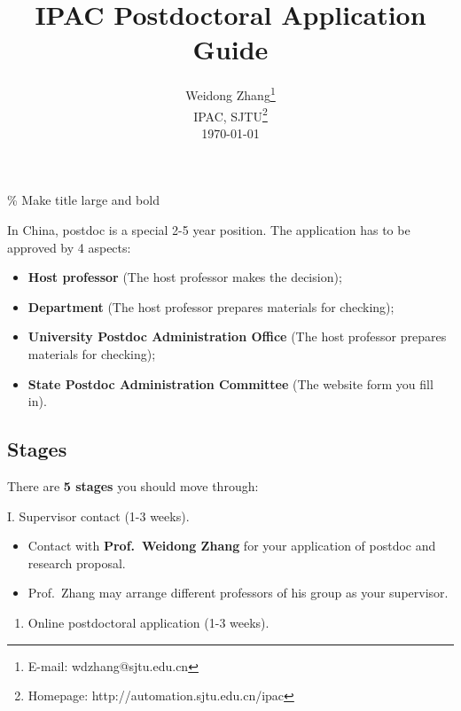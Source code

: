 \documentclass[]{article}
\date{}
\providecommand{\tightlist}{%
  \setlength{\itemsep}{0pt}\setlength{\parskip}{0pt}}
\begin{document}
\newcommand*{\affaddr}[1]{#1}

\% Make title large and bold

\title{\Large\bfseries IPAC Postdoctoral Application Guide}
\author{
    Weidong Zhang\thanks{E-mail: wdzhang@sjtu.edu.cn}\\
IPAC, SJTU\thanks{Homepage: http://automation.sjtu.edu.cn/ipac}\\
\today
}

\maketitle

In China, postdoc is a special 2-5 year position. The application has to
be approved by 4 aspects:

\begin{itemize}
\tightlist
\item
  \textbf{Host professor} (The host professor makes the decision);
\item
  \textbf{Department} (The host professor prepares materials for
  checking);
\item
  \textbf{University Postdoc Administration Office} (The host professor
  prepares materials for checking);
\item
  \textbf{State Postdoc Administration Committee} (The website form you
  fill in).
\end{itemize}

\hypertarget{stages}{%
\subsection{Stages}\label{stages}}

There are \textbf{5 stages} you should move through:

I. Supervisor contact (1-3 weeks).

\begin{itemize}
\tightlist
\item
  Contact with \textbf{Prof.~Weidong Zhang} for your application of
  postdoc and research proposal.
\item
  Prof.~Zhang may arrange different professors of his group as your
  supervisor.
\end{itemize}

\begin{enumerate}
\def\labelenumi{\Roman{enumi}.}
\setcounter{enumi}{1}
\tightlist
\item
  Online postdoctoral application (1-3 weeks).
\end{enumerate}
\end{document}
